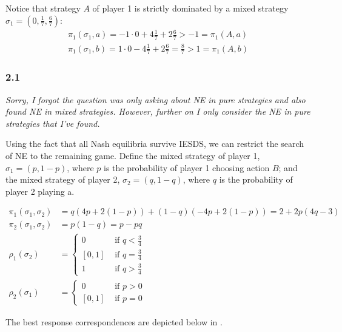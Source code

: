 \documentclass[]{article}
\begin{document}
Notice that strategy $A$ of player 1 is strictly dominated by a mixed strategy $\sigma_1 = (0, \frac{1}{7}, \frac{6}{7})$:
\begin{equation}
	\begin{split}
		\pi_1(\sigma_1, a) = -1\cdot0 + 4\frac{1}{7} + 2\frac{6}{7} > -1 = \pi_1(A, a) \\ \nonumber
		\pi_1(\sigma_1, b) = 1\cdot0 - 4\frac{1}{7} + 2\frac{6}{7} = \frac{8}{7} > 1 = \pi_1(A, b)
	\end{split}
\end{equation}

\subsubsection*{2.1}
\textit{Sorry, I forgot the question was only asking about NE in pure strategies and also found NE in mixed strategies. However, further on I only consider the NE in pure strategies that I've found.}

Using the fact that all Nash equilibria survive IESDS, we can restrict the search of NE to the remaining game. Define the mixed strategy of player 1, $\sigma_1 = (p, 1 - p)$, where $p$ is the probability of player 1 choosing action $B$; and the mixed strategy of player 2, $\sigma_2 = (q, 1 - q)$, where $q$ is the probability of player 2 playing a.

\begin{equation}
	\begin{split}
	\pi_1(\sigma_1, \sigma_2)& = q(4p + 2(1 - p)) + (1 - q)(-4p + 2(1 - p)) = 2 + 2p(4q - 3) \\ \nonumber
	\pi_2(\sigma_1, \sigma_2)& = p(1 - q) = p - pq \\
	\rho_1(\sigma_2)& = \begin{cases}
	0 & \text{ if }q < \frac{3}{4}\\
	[0, 1] & \text{ if }q = \frac{3}{4} \\
	1 & \text{ if }q > \frac{3}{4}\end{cases} \\
	\rho_2(\sigma_1)& = \begin{cases}
	0 & \text{ if }p > 0 \\
	[0, 1] & \text{ if }p = 0
	\end{cases}
	\end{split}
\end{equation}

The best response correspondences are depicted below in .
\end{document}
